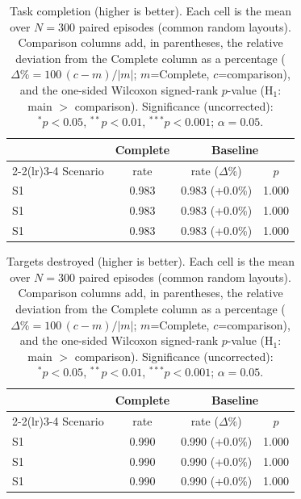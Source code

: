 
\begin{table}[ht]
  \centering
  \caption{Task completion (higher is better). Each cell is the mean over $N=300$ paired episodes (common random layouts). Comparison columns add, in parentheses, the relative deviation from the Complete column as a percentage ($\Delta\%=100\,(c-m)/|m|$; $m$=Complete, $c$=comparison), and the one-sided Wilcoxon signed-rank $p$-value (H$_1$: main $>$ comparison). Significance (uncorrected): $^{*}p<0.05$, $^{**}p<0.01$, $^{***}p<0.001$; $\alpha=0.05$.}
  \label{tab:wilcoxon-completion}
  \small
  \begin{tabular}{l c cc}
    \toprule
     & Complete & \multicolumn{2}{c}{Baseline} \\
    \cmidrule(lr){2-2}\cmidrule(lr){3-4}
    Scenario & {rate} & {rate ($\Delta$\%)} & {$p$} \\
    \midrule
    S1 & 0.983 & 0.983 (+0.0\%) & 1.000 \\
    S1 & 0.983 & 0.983 (+0.0\%) & 1.000 \\
    S1 & 0.983 & 0.983 (+0.0\%) & 1.000 \\
    \bottomrule
  \end{tabular}
\end{table}

\begin{table}[ht]
  \centering
  \caption{Targets destroyed (higher is better). Each cell is the mean over $N=300$ paired episodes (common random layouts). Comparison columns add, in parentheses, the relative deviation from the Complete column as a percentage ($\Delta\%=100\,(c-m)/|m|$; $m$=Complete, $c$=comparison), and the one-sided Wilcoxon signed-rank $p$-value (H$_1$: main $>$ comparison). Significance (uncorrected): $^{*}p<0.05$, $^{**}p<0.01$, $^{***}p<0.001$; $\alpha=0.05$.}
  \label{tab:wilcoxon-targets}
  \small
  \begin{tabular}{l c cc}
    \toprule
     & Complete & \multicolumn{2}{c}{Baseline} \\
    \cmidrule(lr){2-2}\cmidrule(lr){3-4}
    Scenario & {rate} & {rate ($\Delta$\%)} & {$p$} \\
    \midrule
    S1 & 0.990 & 0.990 (+0.0\%) & 1.000 \\
    S1 & 0.990 & 0.990 (+0.0\%) & 1.000 \\
    S1 & 0.990 & 0.990 (+0.0\%) & 1.000 \\
    \bottomrule
  \end{tabular}
\end{table}

